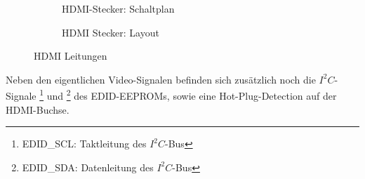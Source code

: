 \begin{figure}[htbp]
        \centering
        \begin{subfigure}[htp]{0.48\textwidth}
%			
			\fbox{	\texttt{[image: TeilB/hdmi\_sch.png]}}
            \caption{HDMI-Stecker: Schaltplan}
            \label{fig:teilb_hdmi_sch}
        \end{subfigure}
\quad 
        \begin{subfigure}[htp]{0.48\textwidth}
 			\caption{HDMI Stecker: Layout}
            \label{fig:teilb_hdmi_pcb}
        \end{subfigure}
        \caption{HDMI Leitungen}
        \label{fig:teilb_hdmi}
\end{figure}
Neben den eigentlichen Video-Signalen befinden sich zusätzlich noch die $I^2C$-Signale \footnote{EDID\_SCL: Taktleitung des $I^2C$-Bus} und \footnote{EDID\_SDA: Datenleitung des $I^2C$-Bus} des EDID-EEPROMs, sowie eine Hot-Plug-Detection auf der HDMI-Buchse.
